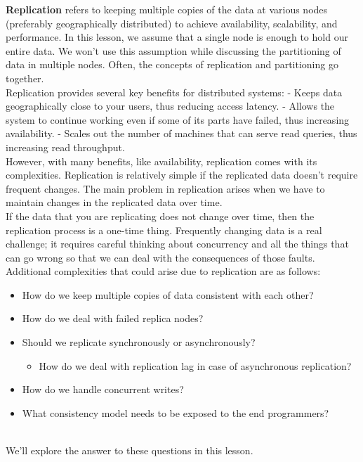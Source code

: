 \textbf{Replication} refers to keeping multiple copies of the data at various nodes (preferably geographically distributed) to achieve availability, scalability, and performance. In this lesson, we assume that a single node is enough to hold our entire data. We won't use this assumption while discussing the partitioning of data in multiple nodes. Often, the concepts of replication and partitioning go together.
\\
Replication provides several key benefits for distributed systems: - Keeps data geographically close to your users, thus reducing access latency. - Allows the system to continue working even if some of its parts have failed, thus increasing availability. - Scales out the number of machines that can serve read queries, thus increasing read throughput.
\\
However, with many benefits, like availability, replication comes with its complexities. Replication is relatively simple if the replicated data doesn't require frequent changes. The main problem in replication arises when we have to maintain changes in the replicated data over time.
\\
If the data that you are replicating does not change over time, then the replication process is a one-time thing. Frequently changing data is a real challenge; it requires careful thinking about concurrency and all the things that can go wrong so that we can deal with the consequences of those faults.
\\
Additional complexities that could arise due to replication are as follows:

\begin{itemize}
\tightlist
\item
How do we keep multiple copies of data consistent with each other?
\item
How do we deal with failed replica nodes?
\item
Should we replicate synchronously or asynchronously?

\begin{itemize}
\tightlist
\item
How do we deal with replication lag in case of asynchronous replication?
\end{itemize}
\item
How do we handle concurrent writes?
\item
What consistency model needs to be exposed to the end programmers?
\end{itemize}
\\
We'll explore the answer to these questions in this lesson.


